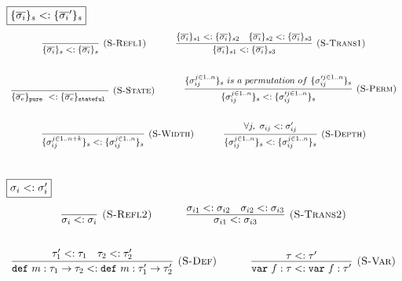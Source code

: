 \documentclass{llncs}
\newcommand{\keywadj}[1]{\mathtt{#1}}
\newcommand{\keyw}[1]{\keywadj{#1}~}
\begin{document}
$\fbox{$\{ \overline{\sigma_i} \}_s <: \{ \overline{\sigma_i}' \}_s$}$
\[
\begin{array}{c}
\infer[\textsc{(S-Refl1)}]
  {\{ \overline{\sigma_i} \}_s <: \{ \overline{\sigma_i} \}_s}
  {}%
~~~~~~~~~~
\infer[\textsc{(S-Trans1)}]
  {\{ \overline{\sigma_i} \}_{s1} <: \{ \overline{\sigma_i} \}_{s3}}
  {\{ \overline{\sigma_i} \}_{s1} <: \{ \overline{\sigma_i} \}_{s2} & \{ \overline{\sigma_i} \}_{s2} <: \{ \overline{\sigma_i} \}_{s3}}\\[5ex]

\infer[\textsc{(S-State)}]
  {\{ \overline{\sigma_e} \}_{\keyw{pure}} <: \{ \overline{\sigma_e} \}_{\keyw{stateful}}}
  {}%
~~~~~~~~~~
\infer[\textsc{(S-Perm)}]
  {\{ \sigma_{ij}^{j \in 1..n} \}_{s} <: \{ \sigma_{ij}'^{j \in 1..n} \}_{s}}
  {\{ \sigma_{ij}^{j \in 1..n} \}_{s}~is~a~permutation~of~\{ \sigma_{ij}'^{j \in 1..n} \}_{s}}\\[5ex]

\infer[\textsc{(S-Width)}]
  {\{ \sigma_{ij}^{j \in 1..n + k} \}_{s} <: \{ \sigma_{ij}^{j \in 1..n} \}_{s}}
  {}%
~~~~~~~~~~
\infer[\textsc{(S-Depth)}]
  {\{ \sigma_{ij}^{j \in 1..n} \}_{s} <: \{ \sigma_{ij}^{j \in 1..n} \}_{s}}
  {\forall j,~\sigma_{ij} <: \sigma_{ij}'}\\[5ex]

\end{array}
\]

\vspace{-3pt}
$\fbox{$\sigma_i <: \sigma_i'$}$
\[
\begin{array}{c}
\infer[\textsc{(S-Refl2)}]
  {\sigma_i <: \sigma_i}
  {}%
~~~~~~~~~~
\infer[\textsc{(S-Trans2)}]
  {\sigma_{i1} <: \sigma_{i3}}
  {\sigma_{i1} <: \sigma_{i2} & \sigma_{i2} <: \sigma_{i3}}\\[5ex]

\infer[\textsc{(S-Def)}]
  {\keyw{def} m:\tau_1 \rightarrow \tau_2 <: \keyw{def} m:\tau_1' \rightarrow \tau_2'}
  {\tau_1' <: \tau_1 & \tau_2 <: \tau_2'}%
~~~~~~~~~~
\infer[\textsc{(S-Var)}]
  {\keyw{var} f:\tau <: \keyw{var} f:\tau'}
  {\tau <: \tau'}\\[5ex]  

\end{array}
\]
\end{document}
